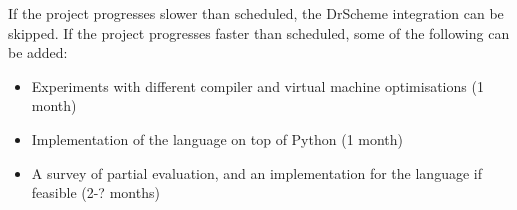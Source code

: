 \documentclass[11pt]{article}
\begin{document}
If the project progresses slower than scheduled, the DrScheme integration can be skipped. If the project progresses faster than scheduled, some of the following can be added:
\begin{itemize}
\item Experiments with different compiler and virtual machine optimisations (1 month)
\item Implementation of the language on top of Python (1 month)
\item A survey of partial evaluation, and an implementation for the language if feasible (2-? months)
\end{itemize}



\begin{figure}
\begin{tabular}{|p{6cm}|p{12cm}|}
\hline
\hline
\end{tabular}
\end{figure}





%
\end{document}
